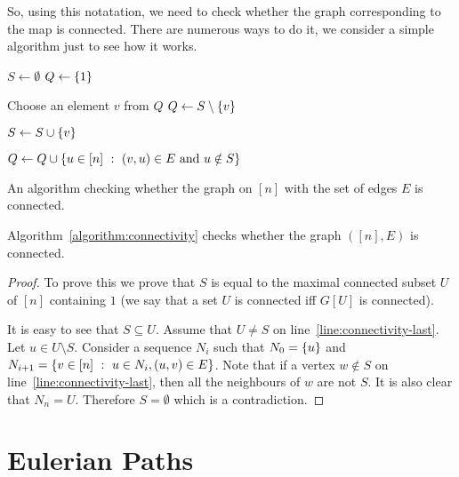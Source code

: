 So, using this notatation, we need to check whether the graph corresponding to
the map is connected.
There are numerous ways to do it, we consider a simple algorithm just to see how
it works.
\begin{algorithm}
  \begin{algorithmic}[1]
      \State $S \gets \emptyset$
      \State $Q \gets \set{1}$

        \State Choose an element $v$ from $Q$
        \State $Q \gets S \setminus \set{v}$

        \State $S \gets S \cup \set{v}$

        \State $Q \gets Q \cup
          \set[{(v, u) \in E \text{ and } u \notin S}]{u \in [n]}$
      \EndWhile
      \label{line:connectivity-last}
      \State {}
    \EndFunction
  \end{algorithmic}
  \caption{An algorithm checking whether the graph on $[n]$ with the set of
  edges $E$ is connected.}
  \label{algorithm:connectivity}
\end{algorithm}

\begin{theorem}
  Algorithm~\ref{algorithm:connectivity} checks whether the graph $([n], E)$
  is connected.
\end{theorem}
\begin{proof}
  To prove this we prove that $S$ is equal to the maximal connected subset $U$
  of $[n]$ containing $1$ (we say that a set $U$ is connected iff $G[U]$ is
  connected).

  It is easy to see that $S \subseteq U$.
  Assume that $U \neq S$ on line~\ref{line:connectivity-last}.
  Let $u \in U \setminus S$. Consider a sequence $N_i$ such that
  $N_0 = \set{u}$ and $N_{i + 1} = \set[{u \in N_i, (u, v) \in E}]{v \in [n]}$.
  Note that if a vertex $w \notin S$ on line~\ref{line:connectivity-last}, then
  all the neighbours of $w$ are not $S$. It is also clear that $N_{n} = U$.
  Therefore $S = \emptyset$ which is a contradiction.
\end{proof}

\section{Eulerian Paths}

